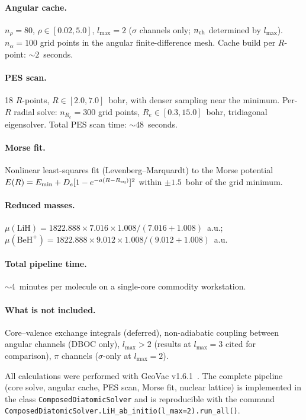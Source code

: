 \documentclass[aps,pra,twocolumn,superscriptaddress,longbibliography,floatfix]{revtex4-2}
\begin{document}
\paragraph{Angular cache.}
$n_\rho = 80$, $\rho \in [0.02, 5.0]$, $l_{\max} = 2$
($\sigma$ channels only; $n_{\rm ch}$ determined by $l_{\max}$).
$n_\alpha = 100$ grid points in the angular finite-difference mesh.
Cache build per $R$-point: ${\sim}2$~seconds.

\paragraph{PES scan.}
18 $R$-points, $R \in [2.0, 7.0]$~bohr, with denser sampling near
the minimum.  Per-$R$ radial solve: $n_{R_e} = 300$ grid points,
$R_e \in [0.3, 15.0]$~bohr, tridiagonal eigensolver.
Total PES scan time: ${\sim}48$~seconds.

\paragraph{Morse fit.}
Nonlinear least-squares fit (Levenberg--Marquardt) to the Morse
potential $E(R) = E_{\min} + D_e[1 - e^{-a(R-R_{\rm eq})}]^2$
within $\pm 1.5$~bohr of the grid minimum.

\paragraph{Reduced masses.}
$\mu(\text{LiH}) = 1822.888 \times 7.016 \times 1.008 / (7.016 + 1.008)$~a.u.;
$\mu(\text{BeH}^+) = 1822.888 \times 9.012 \times 1.008 / (9.012 + 1.008)$~a.u.

\paragraph{Total pipeline time.}
${\sim}4$~minutes per molecule on a single-core commodity workstation.

\paragraph{What is not included.}
Core--valence exchange integrals (deferred),
non-adiabatic coupling between angular channels (DBOC only),
$l_{\max} > 2$ (results at $l_{\max} = 3$ cited for comparison),
$\pi$ channels ($\sigma$-only at $l_{\max} = 2$).

All calculations were performed with GeoVac
v1.6.1~\cite{geovac2026}.  The complete pipeline (core solve, angular
cache, PES scan, Morse fit, nuclear lattice) is implemented in the
class \texttt{ComposedDiatomicSolver} and is reproducible with the
command
\texttt{ComposedDiatomicSolver.LiH\_ab\_initio(l\_max=2).run\_all()}.
\end{document}
